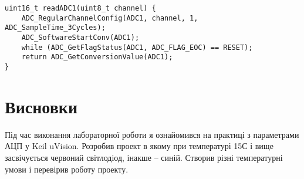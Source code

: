 \documentclass[oneside,14pt]{extarticle}
\begin{document}
\begin{normalsize}
{\begin{lstlisting}
uint16_t readADC1(uint8_t channel) { 
	ADC_RegularChannelConfig(ADC1, channel, 1, ADC_SampleTime_3Cycles);
	ADC_SoftwareStartConv(ADC1); 
	while (ADC_GetFlagStatus(ADC1, ADC_FLAG_EOC) == RESET); 
	return ADC_GetConversionValue(ADC1); 
} 

		\end{lstlisting}
	}
	
	\section*{Висновки}
	Під час виконання лабораторної роботи я ознайомився на практиці з параметрами АЦП у Keil uVision. Розробив проект в якому при температурі 15С і вище засвічується червоний світлодіод, інакше – синій. Створив різні температурні умови і перевірив роботу проекту.
	    
\end{normalsize}
\end{document}
